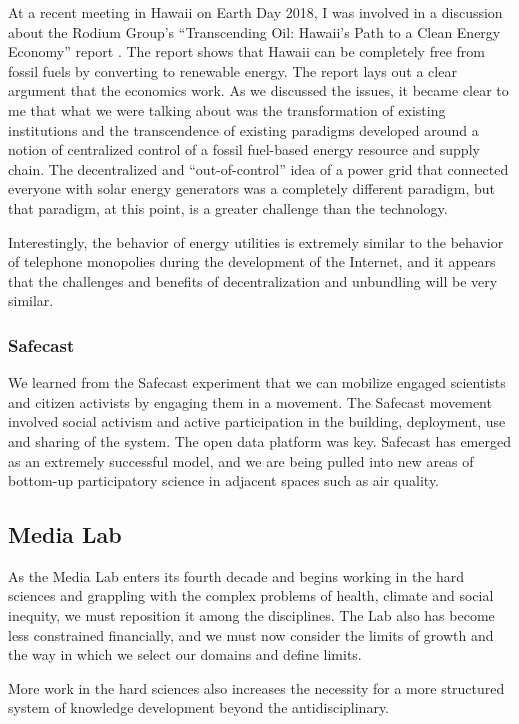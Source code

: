 At a recent meeting in Hawaii on Earth Day 2018, I was involved in a discussion about the Rodium Group's ``Transcending Oil: Hawaii’s Path to a Clean Energy Economy'' report \cite{Transcen68}. The report shows that Hawaii can be completely free from fossil fuels by converting to renewable energy. The report lays out a clear argument that the economics work. As we discussed the issues, it became clear to me that what we were talking about was the transformation of existing institutions and the transcendence of existing paradigms developed around a notion of centralized control of a fossil fuel-based energy resource and supply chain. The decentralized and ``out-of-control'' idea of a power grid that connected everyone with solar energy generators was a completely different paradigm, but that paradigm, at this point, is a greater challenge than the technology.

Interestingly, the behavior of energy utilities is extremely similar to the behavior of telephone monopolies during the development of the Internet, and it appears that the challenges and benefits of decentralization and unbundling will be very similar.

\subsubsection{Safecast}

We learned from the Safecast experiment that we can mobilize engaged scientists and citizen activists by engaging them in a movement. The Safecast movement involved social activism and active participation in the building, deployment, use and sharing of the system. The open data platform was key. Safecast has emerged as an extremely successful model, and we are being pulled into new areas of bottom-up participatory science in adjacent spaces such as air quality.

\subsection{Media Lab}

As the Media Lab enters its fourth decade and begins working in the hard sciences and grappling with the complex problems of health, climate and social inequity, we must reposition it among the disciplines. The Lab also has become less constrained financially, and we must now consider the limits of growth and the way in which we select our domains and define limits.

More work in the hard sciences also increases the necessity for a more structured system of knowledge development beyond the antidisciplinary.

